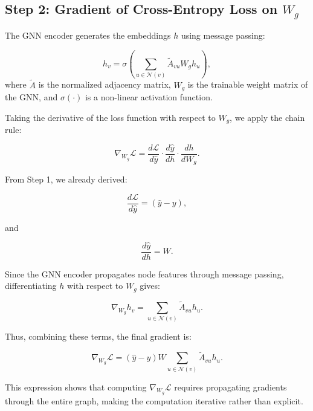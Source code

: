 \documentclass[12pt]{article}
\begin{document}
\subsection*{Step 2: Gradient of Cross-Entropy Loss on $W_g$}
The GNN encoder generates the embeddings $h$ using message passing:

\begin{equation*}
    h_v = \sigma \left( \sum_{u \in \mathcal{N}(v)} \tilde{A}_{vu} W_g h_u \right),
\end{equation*}
where $\tilde{A}$ is the normalized adjacency matrix, $W_g$ is the trainable weight matrix of the GNN, and $\sigma(\cdot)$ is a non-linear activation function.

Taking the derivative of the loss function with respect to $W_g$, we apply the chain rule:

\begin{equation*}
    \nabla_{W_g} \mathcal{L} = \frac{d\mathcal{L}}{d\hat{y}} \cdot \frac{d\hat{y}}{dh} \cdot \frac{dh}{dW_g}.
\end{equation*}

From Step 1, we already derived:

\begin{equation*}
    \frac{d\mathcal{L}}{d\hat{y}} = (\hat{y} - y),
\end{equation*}

and

\begin{equation*}
    \frac{d\hat{y}}{dh} = W.
\end{equation*}

Since the GNN encoder propagates node features through message passing, differentiating $h$ with respect to $W_g$ gives:

\begin{equation*}
    \nabla_{W_g} h_v = \sum_{u \in \mathcal{N}(v)} \tilde{A}_{vu} h_u.
\end{equation*}

Thus, combining these terms, the final gradient is:

\begin{equation*}
    \nabla_{W_g} \mathcal{L} = (\hat{y} - y) W \sum_{u \in \mathcal{N}(v)} \tilde{A}_{vu} h_u.
\end{equation*}

This expression shows that computing $\nabla_{W_g} \mathcal{L}$ requires propagating gradients through the entire graph, making the computation iterative rather than explicit.
\end{document}
